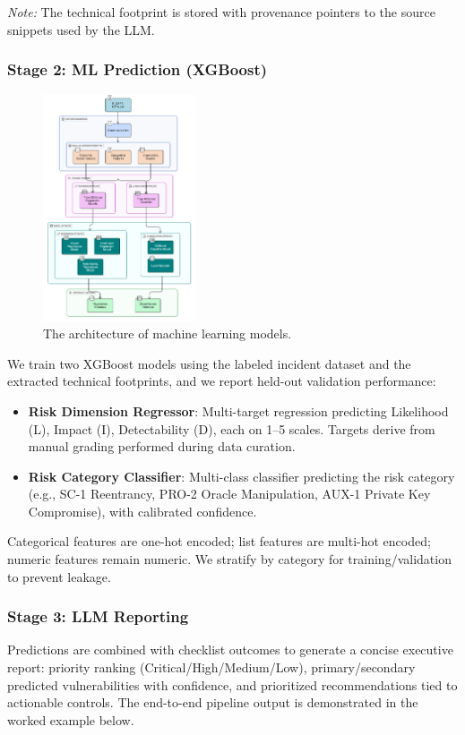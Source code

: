 \begin{multicols}{2}
\textit{Note:} The technical footprint is stored with provenance pointers to the source snippets used by the LLM.

\subsubsection{Stage 2: ML Prediction (XGBoost)}

\begin{figure}[H]
    \centering
    \includegraphics[width=0.4\textwidth]{../figure/methodology/ml.png}
    \caption{The architecture of machine learning models.}
    \label{fig:machine_learning}
\end{figure}

We train two XGBoost models using the labeled incident dataset and the extracted technical footprints, and we report held-out validation performance:
\begin{itemize}
    \item \textbf{Risk Dimension Regressor}: Multi-target regression predicting Likelihood (L), Impact (I), Detectability (D), each on 1--5 scales. Targets derive from manual grading performed during data curation.
    \item \textbf{Risk Category Classifier}: Multi-class classifier predicting the risk category (e.g., SC-1 Reentrancy, PRO-2 Oracle Manipulation, AUX-1 Private Key Compromise), with calibrated confidence.
\end{itemize}
Categorical features are one-hot encoded; list features are multi-hot encoded; numeric features remain numeric. We stratify by category for training/validation to prevent leakage.

\subsubsection{Stage 3: LLM Reporting}
Predictions are combined with checklist outcomes to generate a concise executive report: priority ranking (Critical/High/Medium/Low), primary/secondary predicted vulnerabilities with confidence, and prioritized recommendations tied to actionable controls. The end-to-end pipeline output is demonstrated in the worked example below.


\end{multicols}
